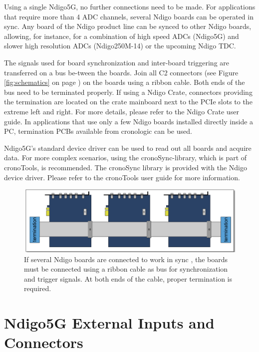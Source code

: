 Using a single Ndigo5G, no further connections need to be made. For applications that require more than 4 ADC channels, several Ndigo boards can be operated in sync. Any board of the Ndigo product line can be synced to other Ndigo boards, allowing, for instance, for a combination of high speed ADCs (Ndigo5G) and slower high resolution ADCs (Ndigo250M-14) or the upcoming Ndigo TDC.\par
The signals used for board synchronization and inter-board triggering are transferred on a bus be-tween the boards. Join all C2 connectors (see Figure \ref{fig:schematics} on page \pageref{fig:schematics}) on the boards using a ribbon cable. Both ends of the bus need to be terminated properly. If using a Ndigo Crate, connectors providing the termination are located on the crate mainboard next to the PCIe slots to the extreme left and right. For more details, please refer to the Ndigo Crate user guide. In applications that use only a few Ndigo boards installed directly inside a PC, termination PCBs available from cronologic can be used.\par
Ndigo5G's standard device driver can be used to read out all boards and acquire data. For more complex scenarios, using the cronoSync-library, which is part of cronoTools, is recommended. The cronoSync library is provided with the Ndigo device driver. Please refer to the cronoTools user guide for more information.
%
\begin{figure}[ht]
		\begin{center}
			\includegraphics[width=\textwidth]{figures/Ndigo_Intercon.pdf}
		\caption{If several Ndigo boards are connected to work in sync , the boards must be 
connected using a ribbon cable as bus for synchronization and trigger signals. At both 
ends of the cable, proper termination is required.}
		\end{center}
	\end{figure}
\section{Ndigo5G External Inputs and Connectors}

